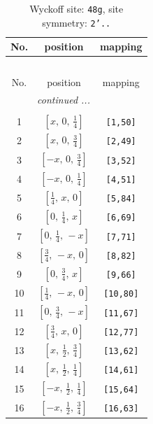\documentclass[fleqn,8pt]{jsarticle}
\begin{document}
\begin{longtable}{ccc}
\caption{Wyckoff site: {\tt 48g}, site symmetry: {\tt 2'..}}
 \\
 \hline \hline
No. & position & mapping \\ \hline \endfirsthead

\multicolumn{2}{l}{\tablename\ \thetable{}} \\
 \hline \hline
No. & position & mapping \\ \hline \endhead

 \hline \hline
\multicolumn{2}{r}{\footnotesize\it continued ...} \\ \endfoot

 \hline \hline
\multicolumn{2}{r}{} \\ \endlastfoot

1 & $\left[ x,\, 0,\, \frac{1}{4} \right]$ & {\tt [1,50]} \\ \hline
2 & $\left[ x,\, 0,\, \frac{3}{4} \right]$ & {\tt [2,49]} \\ \hline
3 & $\left[ - x,\, 0,\, \frac{3}{4} \right]$ & {\tt [3,52]} \\ \hline
4 & $\left[ - x,\, 0,\, \frac{1}{4} \right]$ & {\tt [4,51]} \\ \hline
5 & $\left[ \frac{1}{4},\, x,\, 0 \right]$ & {\tt [5,84]} \\ \hline
6 & $\left[ 0,\, \frac{1}{4},\, x \right]$ & {\tt [6,69]} \\ \hline
7 & $\left[ 0,\, \frac{1}{4},\, - x \right]$ & {\tt [7,71]} \\ \hline
8 & $\left[ \frac{3}{4},\, - x,\, 0 \right]$ & {\tt [8,82]} \\ \hline
9 & $\left[ 0,\, \frac{3}{4},\, x \right]$ & {\tt [9,66]} \\ \hline
10 & $\left[ \frac{1}{4},\, - x,\, 0 \right]$ & {\tt [10,80]} \\ \hline
11 & $\left[ 0,\, \frac{3}{4},\, - x \right]$ & {\tt [11,67]} \\ \hline
12 & $\left[ \frac{3}{4},\, x,\, 0 \right]$ & {\tt [12,77]} \\ \hline
13 & $\left[ x,\, \frac{1}{2},\, \frac{3}{4} \right]$ & {\tt [13,62]} \\ \hline
14 & $\left[ x,\, \frac{1}{2},\, \frac{1}{4} \right]$ & {\tt [14,61]} \\ \hline
15 & $\left[ - x,\, \frac{1}{2},\, \frac{1}{4} \right]$ & {\tt [15,64]} \\ \hline
16 & $\left[ - x,\, \frac{1}{2},\, \frac{3}{4} \right]$ & {\tt [16,63]} \\ \hline

\end{longtable}
\end{document}
